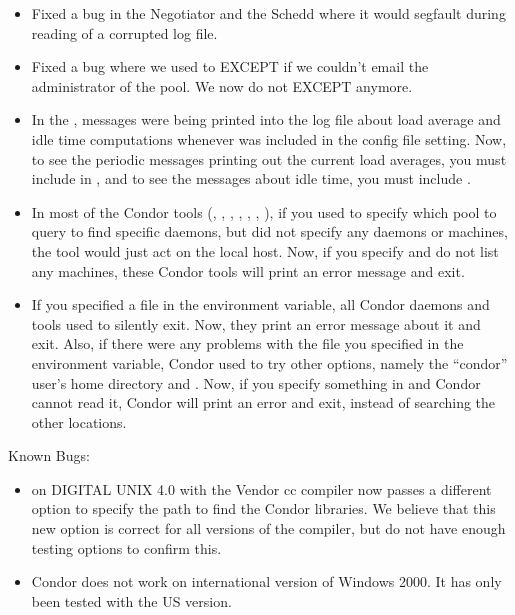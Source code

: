 \begin{itemize}
\item Fixed a bug in the Negotiator and the Schedd where it would segfault
during reading of a corrupted log file.

\item Fixed a bug where we used to EXCEPT if we couldn't email the
administrator of the pool. We now do not EXCEPT anymore.

\item In the , messages were being printed into the log
file about load average and idle time computations whenever
 was included in the  config
file setting.
Now, to see the periodic messages printing out the current load
averages, you must include  in , and
to see the messages about idle time, you must include .

\item In most of the Condor tools (, ,
, , ,
, ), if you used  to
specify which pool to query to find specific daemons, but did not
specify any daemons or machines, the tool would just act on the local
host.
Now, if you specify  and do not list any machines, these
Condor tools will print an error message and exit.

\item If you specified a file in the  environment
variable, all Condor daemons and tools used to silently exit.
Now, they print an error message about it and exit.
Also, if there were any problems with the file you specified in 
the  environment variable, Condor used to try
other options, namely the ``condor'' user's home directory and
.
Now, if you specify something in  and Condor
cannot read it, Condor will print an error and exit, instead of
searching the other locations.

\end{itemize}

\noindent Known Bugs:
\begin{itemize}
\item {} on DIGITAL UNIX 4.0 with the Vendor cc compiler now 
passes a different option to specify the path to find the Condor libraries. We 
believe that this new option is correct for all versions of the compiler, but
do not have enough testing options to confirm this.

\item Condor does not work on international version of Windows 2000. It has
only been tested with the US version.

\end{itemize}

